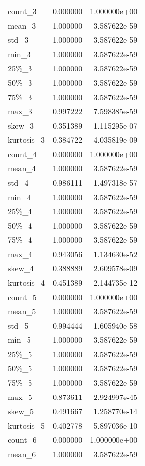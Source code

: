 \begin{tabular}{lrr}
count\_3    &  0.000000 &  1.000000e+00 \\
mean\_3     &  1.000000 &  3.587622e-59 \\
std\_3      &  1.000000 &  3.587622e-59 \\
min\_3      &  1.000000 &  3.587622e-59 \\
25\%\_3      &  1.000000 &  3.587622e-59 \\
50\%\_3      &  1.000000 &  3.587622e-59 \\
75\%\_3      &  1.000000 &  3.587622e-59 \\
max\_3      &  0.997222 &  7.598385e-59 \\
skew\_3     &  0.351389 &  1.115295e-07 \\
kurtosis\_3 &  0.384722 &  4.035819e-09 \\
count\_4    &  0.000000 &  1.000000e+00 \\
mean\_4     &  1.000000 &  3.587622e-59 \\
std\_4      &  0.986111 &  1.497318e-57 \\
min\_4      &  1.000000 &  3.587622e-59 \\
25\%\_4      &  1.000000 &  3.587622e-59 \\
50\%\_4      &  1.000000 &  3.587622e-59 \\
75\%\_4      &  1.000000 &  3.587622e-59 \\
max\_4      &  0.943056 &  1.134630e-52 \\
skew\_4     &  0.388889 &  2.609578e-09 \\
kurtosis\_4 &  0.451389 &  2.144735e-12 \\
count\_5    &  0.000000 &  1.000000e+00 \\
mean\_5     &  1.000000 &  3.587622e-59 \\
std\_5      &  0.994444 &  1.605940e-58 \\
min\_5      &  1.000000 &  3.587622e-59 \\
25\%\_5      &  1.000000 &  3.587622e-59 \\
50\%\_5      &  1.000000 &  3.587622e-59 \\
75\%\_5      &  1.000000 &  3.587622e-59 \\
max\_5      &  0.873611 &  2.924997e-45 \\
skew\_5     &  0.491667 &  1.258770e-14 \\
kurtosis\_5 &  0.402778 &  5.897036e-10 \\
count\_6    &  0.000000 &  1.000000e+00 \\
mean\_6     &  1.000000 &  3.587622e-59 \\

\end{tabular}
